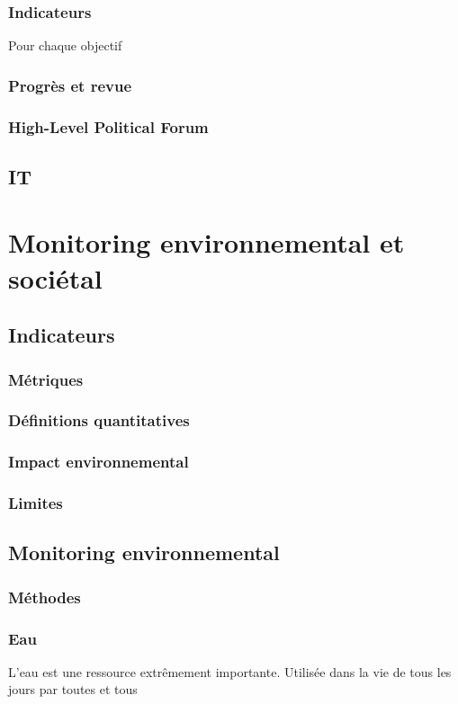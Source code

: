 \documentclass[10pt, conference, compsocconf]{llncs}
\begin{document}
\subsubsection{Indicateurs}
Pour chaque objectif
\subsubsection{Progrès et revue}
\subsubsection{High-Level Political Forum}

\subsection{IT}


\section{Monitoring environnemental et sociétal}
\subsection{Indicateurs}
\subsubsection{Métriques}
\subsubsection{Définitions quantitatives}
\subsubsection{Impact environnemental}			
\subsubsection{Limites}

\subsection{Monitoring environnemental}
\subsubsection{Méthodes}
\subsubsection{Eau}
L'eau est une ressource extrêmement importante. Utilisée dans la vie de tous les jours par toutes et tous 
\end{document}
